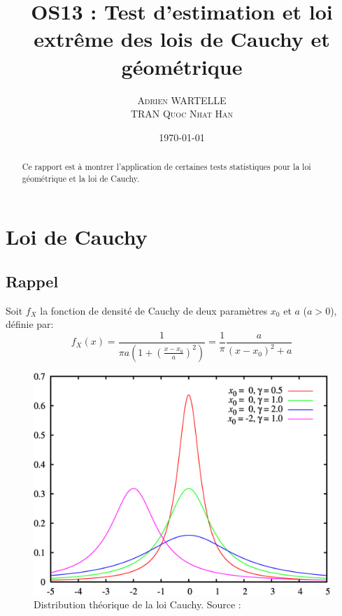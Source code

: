 \documentclass[12pt,a4paper,titlepage]{article}
\title{OS13 : Test d'estimation et loi extrême des lois de Cauchy et géométrique}
\author{\textsc{Adrien WARTELLE} \\ \textsc{TRAN Quoc Nhat Han}}
\date{\today}
\numberwithin{equation}{section}
\begin{document}
\maketitle 
\renewcommand{\contentsname}{Sommaire}
\tableofcontents

\clearpage

\begin{abstract}
Ce rapport est à montrer l'application de certaines tests statistiques pour la loi géométrique et la loi de Cauchy.
\end{abstract}

\section{Loi de Cauchy}
\subsection{Rappel}
Soit $f_X$ la fonction de densité de Cauchy de deux paramètres $x_0$ et $a$ ($a>0$), définie par:
\begin{equation}
\label{dCauchy}
{f_X}\left( x \right) = \frac{1}{{\pi a\left( {1 + {{\left( {\frac{{x - {x_0}}}{a}} \right)}^2}} \right)}} = \frac{1}{\pi }\frac{a}{{{{\left( {x - {x_0}} \right)}^2} + a}}
\end{equation}

\begin{figure}[h]
\includegraphics[width=\linewidth]{images/Cauchy_distribution_theoretic.png}
\caption{Distribution théorique de la loi Cauchy. Source : \cite{WikiLoiCauchy}}
\end{figure}
\end{document}
